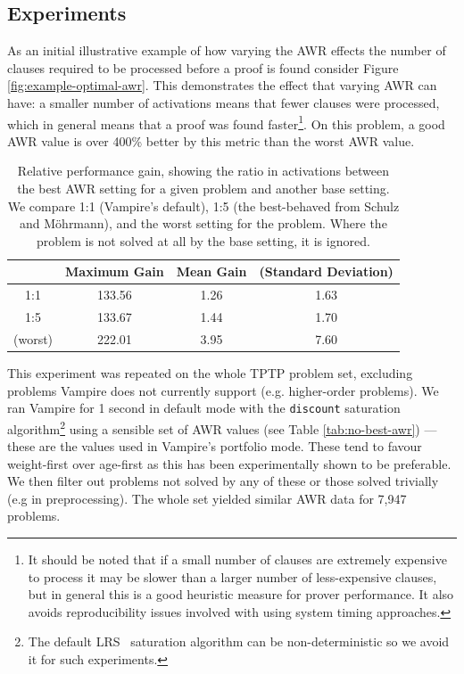 \documentclass{llncs}
\newcommand{\sandm}{Schulz and M{\"{o}}hrmann}
\begin{document}
\subsection{Experiments}
As an initial illustrative example of how varying the AWR effects the number of clauses required to be processed before a proof is found consider Figure \ref{fig:example-optimal-awr}. This demonstrates the effect that varying AWR can have: a smaller number of activations means that fewer clauses were processed, which in general means that a proof was found faster\footnote{
It should be noted that if a small number of clauses are extremely expensive to process it may be slower than a larger number of less-expensive clauses, but in general this is a good heuristic measure for prover performance.
It also avoids reproducibility issues involved with using system timing approaches.
}.
On this problem, a good AWR value is over 400\% better by this metric than the worst AWR value.

\begin{table}[t]
	\caption{
Relative performance gain, showing the ratio in activations between the best AWR setting for a given problem and another base setting.
We compare  1:1 (Vampire's default), 1:5 (the best-behaved from \sandm), and the worst setting for the problem.
Where the problem is not solved at all by the base setting, it is ignored.
}
	\centering
	\begin{tabular}{c | c | c c}
		& Maximum Gain & Mean Gain & (Standard Deviation)\\
		\hline
		1:1 & 133.56 & 1.26 & 1.63 \\
		1:5 & 133.67 & 1.44 & 1.70 \\
		(worst) & 222.01 & 3.95 & 7.60 \\
	\end{tabular}
	\label{tab:awr-improvement}
\end{table}

This experiment was repeated on the whole TPTP problem set, excluding problems Vampire does not currently support (e.g. higher-order problems). We ran Vampire for 1 second in default mode with the \texttt{discount} saturation algorithm\footnote{The default LRS~\cite{LRS} saturation algorithm can be non-deterministic so we avoid it for such experiments.} using a sensible set of AWR values (see Table \ref{tab:no-best-awr}) --- these are the values used in Vampire's portfolio mode. These tend to favour weight-first over age-first as this has been experimentally shown to be preferable. We then filter out problems not solved by any of these or those solved trivially (e.g in preprocessing). The whole set yielded similar AWR data for 7,947 problems. 
\end{document}
